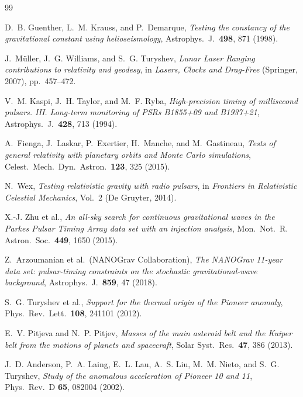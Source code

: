 \documentclass[aps,prd,twocolumn,superscriptaddress,nofootinbib,longbibliography]{revtex4-2}
\begin{document}
\begin{thebibliography}{99}

D.~B. Guenther, L.~M. Krauss, and P.~Demarque,
\textit{Testing the constancy of the gravitational constant using helioseismology},
Astrophys.\ J.\ \textbf{498}, 871 (1998).

J.~M\"{u}ller, J.~G. Williams, and S.~G. Turyshev,
\textit{Lunar Laser Ranging contributions to relativity and geodesy},
in \textit{Lasers, Clocks and Drag-Free} (Springer, 2007), pp.\ 457--472.

V.~M. Kaspi, J.~H. Taylor, and M.~F. Ryba,
\textit{High-precision timing of millisecond pulsars. III. Long-term monitoring of PSRs B1855+09 and B1937+21},
Astrophys.\ J.\ \textbf{428}, 713 (1994).

A.~Fienga, J.~Laskar, P.~Exertier, H.~Manche, and M.~Gastineau,
\textit{Tests of general relativity with planetary orbits and Monte Carlo simulations},
Celest.\ Mech.\ Dyn.\ Astron.\ \textbf{123}, 325 (2015).

N.~Wex,
\textit{Testing relativistic gravity with radio pulsars},
in \textit{Frontiers in Relativistic Celestial Mechanics}, Vol.~2 (De Gruyter, 2014).

X.-J. Zhu et al.,
\textit{An all-sky search for continuous gravitational waves in the Parkes Pulsar Timing Array data set with an injection analysis},
Mon.\ Not.\ R. Astron.\ Soc.\ \textbf{449}, 1650 (2015).

Z.~Arzoumanian et al.\ (NANOGrav Collaboration),
\textit{The NANOGrav 11-year data set: pulsar-timing constraints on the stochastic gravitational-wave background},
Astrophys.\ J.\ \textbf{859}, 47 (2018).

S.~G. Turyshev et al.,
\textit{Support for the thermal origin of the Pioneer anomaly},
Phys.\ Rev.\ Lett.\ \textbf{108}, 241101 (2012).

E.~V. Pitjeva and N.~P. Pitjev,
\textit{Masses of the main asteroid belt and the Kuiper belt from the motions of planets and spacecraft},
Solar Syst.\ Res.\ \textbf{47}, 386 (2013).

J.~D. Anderson, P.~A. Laing, E.~L. Lau, A.~S. Liu, M.~M. Nieto, and S.~G. Turyshev,
\textit{Study of the anomalous acceleration of Pioneer 10 and 11},
Phys.\ Rev.\ D \textbf{65}, 082004 (2002).

\end{thebibliography}
\end{document}
